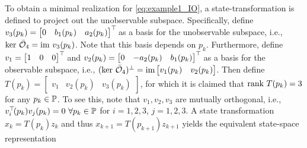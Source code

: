 To obtain a minimal realization for \eqref{eq:example1_IO}, a state-transformation is defined to project out the unobservable subspace. Specifically, define $v_3(p_k) = \begin{bmatrix} 0 & b_1(p_k) & a_2(p_k) \end{bmatrix}^\top\!$ as a basis for the unobservable subspace, i.e., $\text{ker}\ \bar{\mathcal{O}}_4 = \textrm{im}\ v_3(p_k)$. Note that this basis depends on $p_k$. Furthermore, define $v_1 = \begin{bmatrix} 1 & 0 & 0 \end{bmatrix}^\top\!$ and $v_2(p_k) = \begin{bmatrix} 0 & -a_2(p_k) & b_1(p_k) \end{bmatrix}^\top\!$ as a basis for the observable subspace, i.e., $(\text{ker}\ \bar{\mathcal{O}}_4)^\perp = \textrm{im}\begin{bmatrix} v_1(p_k) & v_2(p_k) \end{bmatrix}$. Then define $T(p_k) = \begin{bmatrix} v_1 & v_2(p_k) & v_3(p_k) \end{bmatrix}$, for which it is claimed that $\textrm{rank}\ T(p_k) = 3$ for any $p_k\in\mathbb{P}$. To see this, note that $v_1,v_2,v_3$ are mutually orthogonal, i.e., $v_i^\top\! (p_k) v_j(p_k) = 0 \ \forall p_k \in\mathbb{P}$ for $i=1,2,3$, $j=1,2,3$. A state transformation $x_k = T(p_k) z_k$ and thus $x_{k+1} = T(p_{k+1}) z_{k+1}$ yields the equivalent state-space representation
